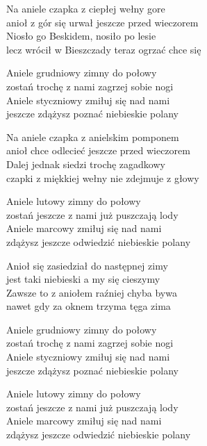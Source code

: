 \begin{text}
    Na aniele czapka z ciepłej wełny gore\\
    anioł z gór się urwał jeszcze przed wieczorem\\
    Niosło go Beskidem,  nosiło po lesie\\
    lecz wrócił w Bieszczady teraz ogrzać chce się

    \vin Aniele grudniowy zimny do połowy\\
    \vin zostań trochę z nami zagrzej sobie nogi\\
    \vin Aniele styczniowy  zmiłuj się nad nami\\
    \vin jeszcze zdążysz poznać  niebieskie polany

    Na aniele czapka z anielskim pomponem\\
    anioł chce odlecieć jeszcze przed wieczorem\\
    Dalej jednak siedzi trochę zagadkowy\\
    czapki z miękkiej wełny nie zdejmuje z głowy

    \vin Aniele lutowy zimny do połowy\\
    \vin zostań jeszcze z nami  już puszczają lody\\
    \vin Aniele marcowy zmiłuj się nad nami\\
    \vin zdążysz jeszcze odwiedzić niebieskie polany

    Anioł się zasiedział do następnej zimy\\
    jest taki niebieski a my się cieszymy\\
    Zawsze to z aniołem  raźniej chyba bywa\\
    nawet gdy za oknem trzyma tęga zima

    \vin Aniele grudniowy  zimny do połowy\\
    \vin zostań trochę z nami  zagrzej sobie nogi\\
    \vin Aniele styczniowy  zmiłuj się nad nami\\
    \vin jeszcze zdążysz poznać  niebieskie polany

    \vin Aniele lutowy zimny do połowy\\
    \vin zostań jeszcze z nami już puszczają lody\\
    \vin Aniele marcowy zmiłuj się nad nami\\
    \vin zdążysz jeszcze odwiedzić niebieskie polany
\end{text}
